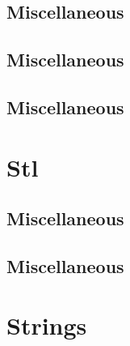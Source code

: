 \vspace{-.7\baselineskip}\hrulefill
\vspace{0.1\baselineskip}\subsection{Miscellaneous}
\raggedbottom
\vspace{-.7\baselineskip}\hrulefill
\vspace{0.1\baselineskip}\subsection{Miscellaneous}
\raggedbottom
\vspace{-.7\baselineskip}\hrulefill
\vspace{0.1\baselineskip}\subsection{Miscellaneous}
\raggedbottom
\vspace{-.7\baselineskip}\hrulefill
\vspace{0.1\baselineskip}
\section{Stl}
\subsection{Miscellaneous}
\raggedbottom
\vspace{-.7\baselineskip}\hrulefill
\vspace{0.1\baselineskip}\subsection{Miscellaneous}
\raggedbottom
\vspace{-.7\baselineskip}\hrulefill
\vspace{0.1\baselineskip}
\section{Strings}
